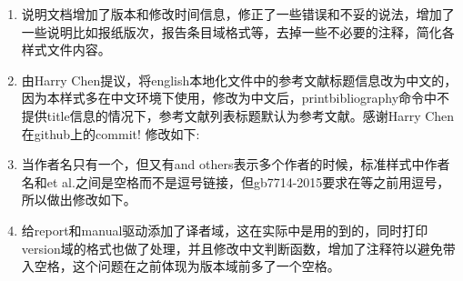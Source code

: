 \begin{enumerate}
\item 说明文档增加了版本和修改时间信息，修正了一些错误和不妥的说法，增加了一些说明比如报纸版次，报告条目域格式等，去掉一些不必要的注释，简化各样式文件内容。

\item 由Harry Chen提议，将english本地化文件中的参考文献标题信息改为中文的，因为本样式多在中文环境下使用，修改为中文后，printbibliography命令中不提供title信息的情况下，参考文献列表标题默认为参考文献。感谢Harry Chen在github上的commit!
修改如下:
\begin{texlist}
\end{texlist}


\item 当作者名只有一个，但又有and others表示多个作者的时候，标准样式中作者名和et al.之间是空格而不是逗号链接，但gb7714-2015要求在等之前用逗号，所以做出修改如下。

\begin{texlist}
\end{texlist}

\item 给report和manual驱动添加了译者域，这在实际中是用的到的，同时打印version域的格式也做了处理，并且修改中文判断函数，增加了注释符以避免带入空格，这个问题在之前体现为版本域前多了一个空格。
\begin{texlist}
\end{texlist}


\end{enumerate}
